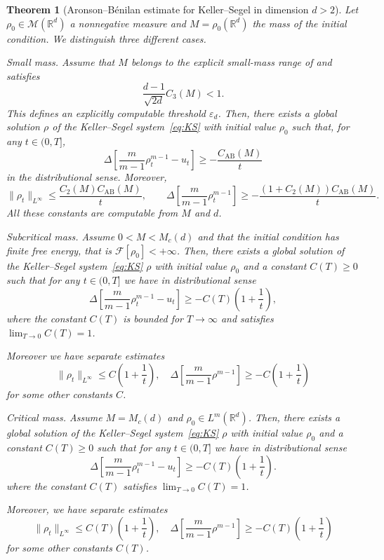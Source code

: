 \documentclass[11pt,a4paper]{article}
\numberwithin{equation}{section}
\newcommand{\R}{{\mathbb{R}}}
\theoremstyle{plain}
\newtheorem{theorem}{Theorem}[section]
\theoremstyle{remark}
\newcommand {\f}{\frac}
\begin{document}
\begin{theorem}[Aronson--B\'enilan estimate for Keller--Segel in dimension $d>2$]\label{thm: Aronson--B\'enilan}
Let $\rho_0 \in \mathcal{M}(\R^d)$ a nonnegative measure and $M=\rho_{0}(\R^d)$ the mass of the initial condition. We distinguish three different cases.
\begin{enumeratetheorem}

\item\label{2d_small_mass_multid}
Small mass. Assume that $M$ belongs to the explicit small-mass
range of  and satisfies
$$
\frac{d-1}{\sqrt{2d}}C_3(M)<1.
$$
This defines an explicitly computable threshold $\varepsilon_d$.
Then, there exists a global solution $\rho$ of the Keller--Segel
system~\eqref{eq:KS} with initial value $\rho_0$ such that, for any
$t\in(0,T]$,
$$
\Delta\left[
    \frac{m}{m-1}\rho_t^{m-1}-u_t
\right]
    \ge -\frac{C_{\mathrm{AB}}(M)}{t}
$$
in the distributional sense. Moreover,
$$
\|\rho_t\|_{L^\infty}
    \le
    \frac{C_2(M)C_{\mathrm{AB}}(M)}{t},
\qquad
\Delta\left[
    \frac{m}{m-1}\rho_t^{m-1}
\right]
    \ge
    -\frac{(1+C_2(M))C_{\mathrm{AB}}(M)}{t}.
$$
All these constants are computable from $M$ and $d$.

    \item\label{2d_full_mass_multid} Subcritical mass. Assume $0<M<M_c(d)$ and that the initial condition has finite free energy, that is $\mathcal{F}[\rho_0]<+\infty$. Then, there exists a global solution of the Keller--Segel system~\eqref{eq:KS} $\rho$ with initial value $\rho_{0}$ and a constant $C(T)\ge 0$ such that for any $t\in (0,T]$ we have in distributional sense
    $$
\Delta \left[\frac{m}{m-1}\rho^{m-1}_t - u_t\right]\ge -C(T)\left(1+\frac{1}{t}\right),
$$
where the constant $C(T)$ is bounded for $T\to\infty$ and satisfies $\lim_{T\to 0}C(T)=1$.

Moreover we have separate estimates
$$
\|\rho_t\|_{L^{\infty}}\leq C\left(1+\f{1}{t}\right) , \quad \Delta \left[\f{m}{m-1}\rho^{m-1} \right]\ge -C\left(1+\f{1}{t}\right)
$$
for some other constants $C$.

\item\label{2d_exact_mass_multid} Critical mass. Assume $M=M_c(d)$ and $\rho_0\in L^m(\R^d)$. Then, there exists a global solution of the Keller--Segel system~\eqref{eq:KS} $\rho$ with initial value $\rho_{0}$ and a constant $C(T)\ge 0$ such that for any $t\in (0,T]$ we have in distributional sense
    $$
\Delta \left[ \f{m}{m-1}\rho^{m-1}_t - u_t \right]\ge -C(T)\left(1+\f{1}{t}\right).
$$
where the constant $C(T)$ satisfies $\lim_{T\to 0}C(T)=1$.

Moreover, we have separate estimates
$$
    \|\rho_t\|_{L^{\infty}}\leq C(T)\left(1+\f{1}{t}\right) , \quad \Delta \left[ \f{m}{m-1}\rho^{m-1} \right] \ge -C(T)\left(1+\f{1}{t}\right)
$$
for some other constants $C(T)$.
\end{enumeratetheorem}

\end{theorem}
\end{document}
